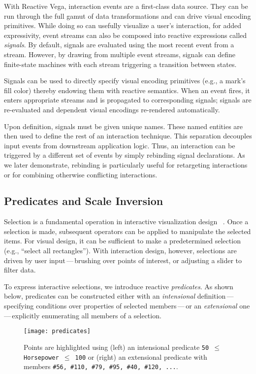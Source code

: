 With Reactive Vega, interaction events are a first-class data source. They can
be run through the full gamut of data transformations and can drive visual
encoding primitives. While doing so can usefully visualize a user's interaction,
for added expressivity, event streams can also be composed into reactive
expressions called \emph{signals}. By default, signals are evaluated using the
most recent event from a stream. However, by drawing from multiple event
streams, signals can define finite-state machines with each stream triggering a
transition between states.

Signals can be used to directly specify visual encoding primitives (e.g., a
mark's fill color) thereby endowing them with reactive semantics. When an event
fires, it enters appropriate streams and is propagated to corresponding signals;
signals are re-evaluated and dependent visual encodings re-rendered
automatically.

Upon definition, signals must be given unique names. These named entities are
then used to define the rest of an interaction technique. This separation
decouples input events from downstream application logic. Thus, an interaction
can be triggered by a different set of events by simply rebinding signal
declarations. As we later demonstrate, rebinding is particularly useful for
retargeting interactions or for combining otherwise conflicting interactions.

\subsection{Predicates and Scale Inversion}

Selection is a fundamental operation in interactive visualization design~
\cite{heer:generalized}. Once a selection is made, subsequent operators can be
applied to manipulate the selected items. For visual design, it can be
sufficient to make a predetermined selection (e.g., ``select all rectangles'').
With interaction design, however, selections are driven by user
input\,---\,brushing over points of interest, or adjusting a slider to filter
data.

To express interactive selections, we introduce reactive \emph{predicates}.
As shown below, predicates can be constructed either with an \emph{intensional}
definition\,---\,specifying conditions over properties of selected
members\,---\,or an \emph{extensional} one\,---\,explicitly enumerating all
members of a selection.

\begin{figure}[h!]
  \centering
  \texttt{[image: predicates]}
  \caption{Points are highlighted using (left) an intensional predicate
  \texttt{50 $\leq$ Horsepower $\leq$ 100} or (right) an extensional predicate
  with members \texttt{\#56, \#110, \#79, \#95, \#40, \#120, ...}.}
  \label{fig:vg:predicates}
\end{figure}

